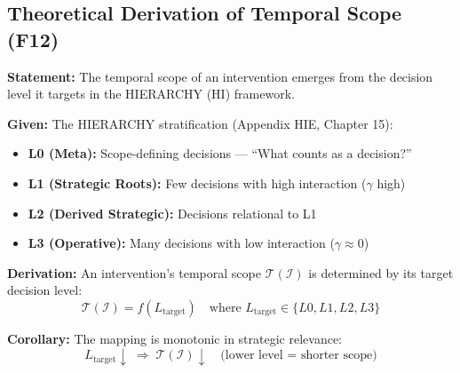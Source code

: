 \subsection{Theoretical Derivation of Temporal Scope (F12)}
\label{sec:hhh-temporal}

\begin{tcolorbox}[colback=blue!5!white, colframe=blue!75!black,
    title=\textbf{Theorem HHH-T2: Temporal Scope Emergence from HIERARCHY}]

\textbf{Statement:} The temporal scope of an intervention emerges from the decision level it targets in the HIERARCHY (HI) framework.

\textbf{Given:} The HIERARCHY stratification (Appendix HIE, Chapter 15):
\begin{itemize}[nosep]
    \item \textbf{L0 (Meta):} Scope-defining decisions --- ``What counts as a decision?''
    \item \textbf{L1 (Strategic Roots):} Few decisions with high interaction ($\gamma$ high)
    \item \textbf{L2 (Derived Strategic):} Decisions relational to L1
    \item \textbf{L3 (Operative):} Many decisions with low interaction ($\gamma \approx 0$)
\end{itemize}

\textbf{Derivation:} An intervention's temporal scope $\mathcal{T}(\mathcal{I})$ is determined by its target decision level:
\begin{equation}
\mathcal{T}(\mathcal{I}) = f(L_{\text{target}}) \quad \text{where } L_{\text{target}} \in \{L0, L1, L2, L3\}
\label{eq:hhh-temporal-mapping}
\end{equation}

\textbf{Corollary:} The mapping is monotonic in strategic relevance:
\begin{equation}
L_{\text{target}} \downarrow \; \Rightarrow \; \mathcal{T}(\mathcal{I}) \downarrow \quad \text{(lower level = shorter scope)}
\end{equation}

\end{tcolorbox}

